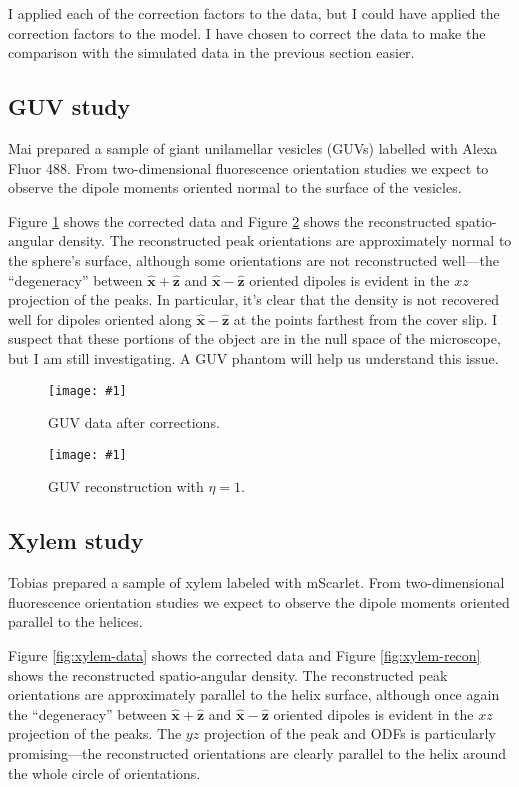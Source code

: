 \documentclass[11pt]{article}
\providecommand{\mh}[1]{\mathbf{\hat{#1}}}
\providecommand{\fig}[4]{
\begin{figure}[H]
 \captionsetup{width=1.0\linewidth}
 \centering
 \texttt{[image: \#1]}
 \caption{#3}
 \label{fig:#4}
\end{figure}
}
\begin{document}
I applied each of the correction factors to the data, but I could have applied
the correction factors to the model. I have chosen to correct the data to make
the comparison with the simulated data in the previous section easier. 

\subsection{GUV study}
Mai prepared a sample of giant unilamellar vesicles (GUVs) labelled with Alexa
Fluor 488. From two-dimensional fluorescence orientation studies we expect to
observe the dipole moments oriented normal to the surface of the vesicles.

Figure \ref{fig:guv-data} shows the corrected data and Figure
\ref{fig:guv-recon} shows the reconstructed spatio-angular density. The
reconstructed peak orientations are approximately normal to the sphere's
surface, although some orientations are not reconstructed well---the
``degeneracy'' between $\mh{x} + \mh{z}$ and $\mh{x} - \mh{z}$ oriented dipoles
is evident in the $xz$ projection of the peaks. In particular, it's
clear that the density is not recovered well for dipoles oriented along
$\mh{x} - \mh{z}$ at the points farthest from the cover slip. I suspect that
these portions of the object are in the null space of the microscope, but I am
still investigating. A GUV phantom will help us understand this issue.

\fig{../figures/guv-recon/data-corrected.pdf}{1.0}{GUV data after corrections.}{guv-data}
\vspace{-1em}
\fig{{../figures/guv-recon/guv-recon-1.0e+00}.pdf}{1.0}{GUV reconstruction with $\eta = 1$.}{guv-recon}
\vspace{-2em}
\subsection{Xylem study}
Tobias prepared a sample of xylem labeled with mScarlet. From two-dimensional
fluorescence orientation studies we expect to observe the dipole moments
oriented parallel to the helices.

Figure \ref{fig:xylem-data} shows the corrected data and Figure
\ref{fig:xylem-recon} shows the reconstructed spatio-angular density. The
reconstructed peak orientations are approximately parallel to the helix surface,
although once again the ``degeneracy'' between $\mh{x} + \mh{z}$ and
$\mh{x} - \mh{z}$ oriented dipoles is evident in the $xz$ projection of the
peaks. The $yz$ projection of the peak and ODFs is particularly promising---the
reconstructed orientations are clearly parallel to the helix around the whole
circle of orientations.
\end{document}
